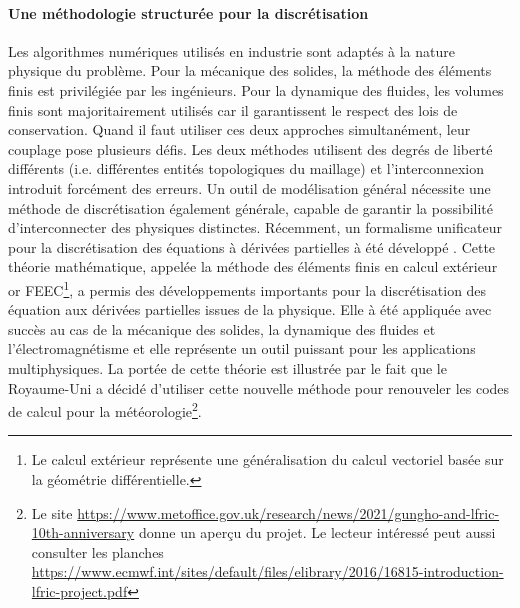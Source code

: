 \documentclass[12pt, french]{article}
\begin{document}
	\paragraph{\large Une méthodologie structurée pour la discrétisation \\}
	Les algorithmes numériques utilisés en industrie sont adaptés à la nature physique du problème. Pour la mécanique des solides, la méthode des éléments finis est privilégiée par les ingénieurs. Pour la dynamique des fluides, les volumes finis sont majoritairement utilisés car il garantissent le respect des lois de conservation. Quand il faut utiliser ces deux approches simultanément, leur couplage pose plusieurs défis. Les deux méthodes utilisent des degrés de liberté différents (i.e. différentes entités topologiques du maillage) et l'interconnexion introduit forcément des erreurs. Un outil de modélisation général nécessite une méthode de discrétisation également générale, capable de  garantir la possibilité d'interconnecter des physiques distinctes. Récemment, un formalisme unificateur pour la discrétisation des équations à dérivées partielles  à été développé  \cite{arnold2006acta}. Cette théorie mathématique, appelée la méthode des éléments finis en calcul extérieur or FEEC\footnote{Le calcul extérieur représente une généralisation du calcul vectoriel basée sur la géométrie différentielle.}, a permis des développements importants pour la discrétisation des équation aux dérivées partielles issues de la physique. Elle à été appliquée avec succès au cas de la mécanique des solides, la dynamique des fluides et l'électromagnétisme et elle représente un outil puissant pour les applications multiphysiques. La portée de cette théorie est illustrée par le fait que le Royaume-Uni a décidé d'utiliser cette nouvelle méthode pour renouveler les codes de calcul pour la météorologie\footnote{Le site \url{https://www.metoffice.gov.uk/research/news/2021/gungho-and-lfric-10th-anniversary} donne un aperçu du projet. Le lecteur intéressé peut aussi consulter les planches  \url{https://www.ecmwf.int/sites/default/files/elibrary/2016/16815-introduction-lfric-project.pdf}}.
	
\end{document}
